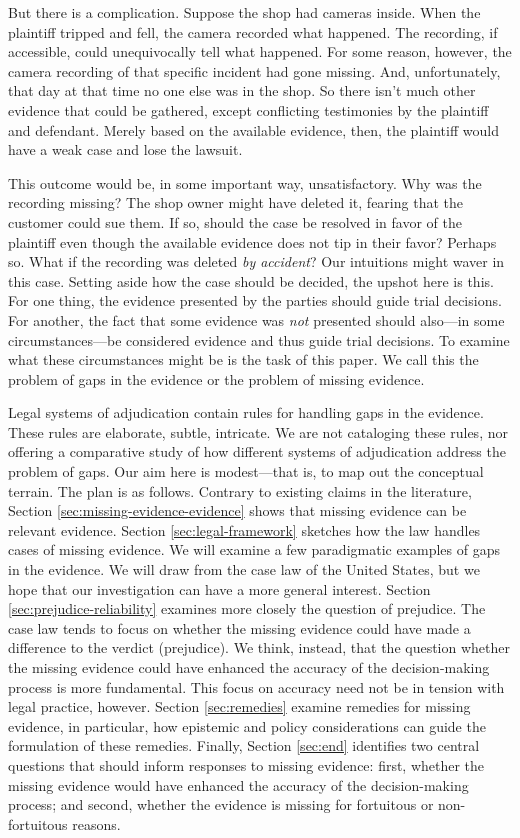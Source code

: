 \documentclass[
  10pt,
  dvipsnames,enabledeprecatedfontcommands]{scrartcl}
\begin{document}
But there is a complication. Suppose the shop had cameras inside. When
the plaintiff tripped and fell, the camera recorded what happened. The
recording, if accessible, could unequivocally tell what happened. For
some reason, however, the camera recording of that specific incident had
gone missing. And, unfortunately, that day at that time no one else was
in the shop. So there isn't much other evidence that could be gathered,
except conflicting testimonies by the plaintiff and defendant. Merely
based on the available evidence, then, the plaintiff would have a weak
case and lose the lawsuit.

This outcome would be, in some important way, unsatisfactory. Why was
the recording missing? The shop owner might have deleted it, fearing
that the customer could sue them. If so, should the case be resolved in
favor of the plaintiff even though the available evidence does not tip
in their favor? Perhaps so. What if the recording was deleted \emph{by
accident}? Our intuitions might waver in this case. Setting aside how
the case should be decided, the upshot here is this. For one thing, the
evidence presented by the parties should guide trial decisions. For
another, the fact that some evidence was \textit{not} presented should
also---in some circumstances---be considered evidence and thus guide
trial decisions. To examine what these circumstances might be is the
task of this paper. We call this the problem of gaps in the evidence or
the problem of missing evidence.

Legal systems of adjudication contain rules for handling gaps in the
evidence. These rules are elaborate, subtle, intricate. We are not
cataloging these rules, nor offering a comparative study of how
different systems of adjudication address the problem of gaps. Our aim
here is modest---that is, to map out the conceptual terrain. The plan is
as follows. Contrary to existing claims in the literature, Section
\ref{sec:missing-evidence-evidence} shows that missing evidence can be
relevant evidence. Section \ref{sec:legal-framework} sketches how the
law handles cases of missing evidence. We will examine a few
paradigmatic examples of gaps in the evidence. We will draw from the
case law of the United States, but we hope that our investigation can
have a more general interest. Section \ref{sec:prejudice-reliability}
examines more closely the question of prejudice. The case law tends to
focus on whether the missing evidence could have made a difference to
the verdict (prejudice). We think, instead, that the question whether
the missing evidence could have enhanced the accuracy of the
decision-making process is more fundamental. This focus on accuracy need
not be in tension with legal practice, however. Section
\ref{sec:remedies} examine remedies for missing evidence, in particular,
how epistemic and policy considerations can guide the formulation of
these remedies. Finally, Section \ref{sec:end} identifies two central
questions that should inform responses to missing evidence: first,
whether the missing evidence would have enhanced the accuracy of the
decision-making process; and second, whether the evidence is missing for
fortuitous or non-fortuitous reasons.
\end{document}
